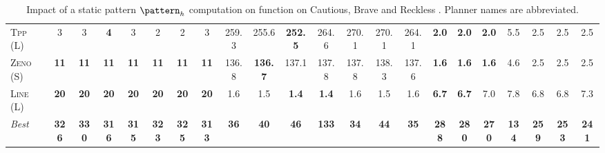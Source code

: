 \begin{table}[tb]
{\begin{tabular}{|l||ccccccc||ccccccc||ccccccc||}
\textsc{Tpp} (L)&3&3&\textbf{4}&3&2&2&3&259.3&255.6&\textbf{252.5}&264.6&270.1&270.1&264.1&\textbf{2.0}&\textbf{2.0}&\textbf{2.0}&5.5&2.5&2.5&2.5\\
\textsc{Zeno} (S)&\textbf{11}&\textbf{11}&\textbf{11}&\textbf{11}&\textbf{11}&\textbf{11}&\textbf{11}&136.8&\textbf{136.7}&137.1&137.8&137.8&138.3&137.6&\textbf{1.6}&\textbf{1.6}&\textbf{1.6}&4.6&2.5&2.5&2.5\\
\textsc{Line} (L)&\textbf{20}&\textbf{20}&\textbf{20}&\textbf{20}&\textbf{20}&\textbf{20}&\textbf{20}&1.6&1.5&\textbf{1.4}&\textbf{1.4}&1.6&1.5&1.6&\textbf{6.7}&\textbf{6.7}&7.0&7.8&6.8&6.8&7.3
\\\hline
\textit{Best}&\textbf{326}&\textbf{330}&\textbf{316}&\textbf{315}&\textbf{323}&\textbf{325}&\textbf{313}&\textbf{36}&\textbf{40}&\textbf{46}&\textbf{133}&\textbf{34}&\textbf{44}&\textbf{35}&\textbf{288}&\textbf{280}&\textbf{270}&\textbf{134}&\textbf{259}&\textbf{253}&\textbf{241}\\\hline

        \end{tabular}}
        \caption{Impact of a static pattern $\pattern_h$ computation on function on Cautious, Brave and Reckless \pattyd. Planner names are abbreviated.}
        \label{tab:abl-patternh-static}
        \end{table}
        